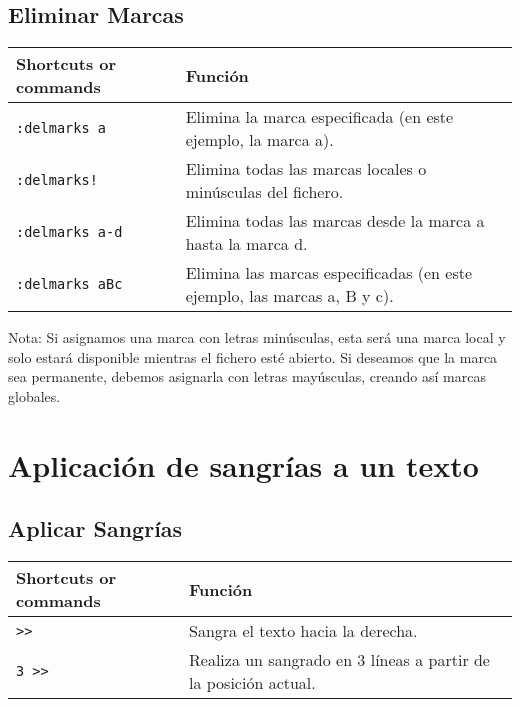 \documentclass[
  doc,
  floatsintext,
  longtable,
  a4paper,
  nolmodern,
  notxfonts,
  notimes,
  colorlinks=true,linkcolor=blue,citecolor=blue,urlcolor=blue]{apa7}
\begin{document}
\subsection{Eliminar Marcas}\label{eliminar-marcas}

\begin{longtable}[]{@{}
  >{\raggedright\arraybackslash}p{}
  >{\raggedright\arraybackslash}p{}@{}}
\toprule\noalign{}
\begin{minipage}[b]{\linewidth}\raggedright
Shortcuts or commands
\end{minipage} & \begin{minipage}[b]{\linewidth}\raggedright
Función
\end{minipage} \\
\midrule\noalign{}
\endhead
\bottomrule\noalign{}
\endlastfoot
\texttt{:delmarks\ a} & Elimina la marca especificada (en este ejemplo,
la marca a). \\
\texttt{:delmarks!} & Elimina todas las marcas locales o minúsculas del
fichero. \\
\texttt{:delmarks\ a-d} & Elimina todas las marcas desde la marca a
hasta la marca d. \\
\texttt{:delmarks\ aBc} & Elimina las marcas especificadas (en este
ejemplo, las marcas a, B y c). \\
\end{longtable}

Nota: Si asignamos una marca con letras minúsculas, esta será una marca
local y solo estará disponible mientras el fichero esté abierto. Si
deseamos que la marca sea permanente, debemos asignarla con letras
mayúsculas, creando así marcas globales.

\section{Aplicación de sangrías a un
texto}\label{aplicaciuxf3n-de-sangruxedas-a-un-texto}

\subsection{Aplicar Sangrías}\label{aplicar-sangruxedas}

\begin{longtable}[]{@{}
  >{\raggedright\arraybackslash}p{}
  >{\raggedright\arraybackslash}p{}@{}}
\toprule\noalign{}
\begin{minipage}[b]{\linewidth}\raggedright
Shortcuts or commands
\end{minipage} & \begin{minipage}[b]{\linewidth}\raggedright
Función
\end{minipage} \\
\midrule\noalign{}
\endhead
\bottomrule\noalign{}
\endlastfoot
\texttt{\textgreater{}\textgreater{}} & Sangra el texto hacia la
derecha. \\
\texttt{3\ \textgreater{}\textgreater{}} & Realiza un sangrado en 3
líneas a partir de la posición actual. \\
\end{longtable}
\end{document}
